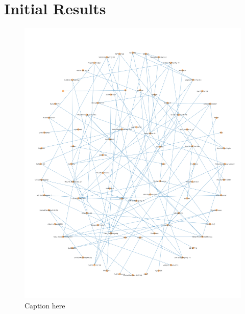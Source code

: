 \section{Initial Results}

\begin{figure}[htbp!]
    \centering
    \includegraphics[width=\linewidth]{../img/neighbourhoods/overall.png}
    \caption{Caption here}
    \label{fig:figure1}
\end{figure}

